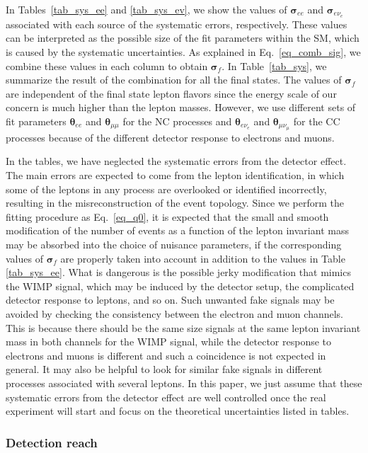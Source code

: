 \documentclass[12pt,twoside,book]{article}
\begin{document}
In Tables~\ref{tab_sys_ee} and \ref{tab_sys_ev}, we show the values of $\bm{\sigma}_{ee}$ and $\bm{\sigma}_{e\nu_e}$ associated with each source of the systematic errors, respectively.
These values can be interpreted as the possible size of the fit parameters within the SM, which is caused by the systematic uncertainties.
As explained in Eq.~\eqref{eq_comb_sig}, we combine these values in each column to obtain $\bm{\sigma}_f$.
In Table~\ref{tab_sys}, we summarize the result of the combination for all the final states.
The values of $\bm{\sigma}_f$ are independent of the final state lepton flavors since the energy scale of our concern is much higher than the lepton masses.
However, we use different sets of fit parameters $\bm{\theta}_{ee}$ and $\bm{\theta}_{\mu\mu}$ for the NC processes and $\bm{\theta}_{e\nu_e}$ and $\bm{\theta}_{\mu\nu_\mu}$ for the CC processes because of the different detector response to electrons and muons.

In the tables, we have neglected the systematic errors from the detector effect.
The main errors are expected to come from the lepton identification, in which some of the leptons in any process are overlooked or identified incorrectly, resulting in the misreconstruction of the event topology.
Since we perform the fitting procedure as Eq.~\eqref{eq_q0}, it is expected that the small and smooth modification of the number of events as a function of the lepton invariant mass may be absorbed into the choice of nuisance parameters, if the corresponding values of $\bm{\sigma}_f$ are properly taken into account in addition to the values in Table
\ref{tab_sys_ee}.
What is dangerous is the possible jerky modification that mimics the WIMP signal, which may be induced by the detector setup, the complicated detector response to leptons, and so on.
Such unwanted fake signals may be avoided by checking the consistency between the electron and muon channels.
This is because there should be the same size signals at the same lepton invariant mass in both channels for the WIMP signal, while the detector response to electrons and muons is different and such a coincidence is not expected in general.
It may also be helpful to look for similar fake signals in different processes associated with several leptons.
In this paper, we just assume that these systematic errors from the detector effect are well controlled once the real experiment will start and focus on the theoretical uncertainties listed in tables.


\subsubsection{Detection reach}
\label{sec_detection}
\end{document}
